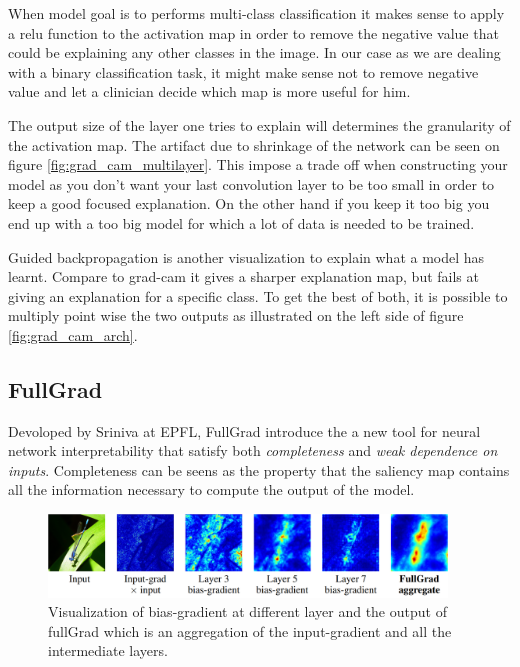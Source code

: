 When model goal is to performs multi-class classification it makes sense to apply a relu function to the activation map in order to remove the negative value that could be explaining any other classes in the image. In our case as we are dealing with a binary classification task, it might make sense not to remove negative value and let a clinician decide which map is more useful for him.

The output size of the layer one tries to explain will determines the granularity of the activation map. The artifact due to shrinkage of the network can be seen on figure \ref{fig:grad_cam_multilayer}. This impose a trade off when constructing your model as you don’t want your last convolution layer to be too small in order to keep a good focused explanation. On the other hand if you keep it too big you end up with a too big model for which a lot of data is needed to be trained.

Guided backpropagation\cite{guided_backprop_springenberg2014striving} is another visualization to explain what a model has learnt. Compare to grad-cam it gives a sharper explanation map, but fails at giving an explanation for a specific class. To get the best of both, it is possible to multiply point wise the two outputs as illustrated on the left side of figure \ref{fig:grad_cam_arch}.


\subsection{FullGrad}

Devoloped by Sriniva at EPFL, FullGrad\cite{fullgradient} introduce the a new tool for neural network interpretability that satisfy both \textit{completeness} and \textit{weak dependence on inputs}. Completeness can be seens as the property that the saliency map contains all the information necessary to compute the output of the model.

\begin{figure}
    \centering
    \includegraphics[width=400]{figures/fullgrad_layer_agregation.png}
    \caption[FullGradExample]{Visualization\cite{fullgradient} of bias-gradient at different layer and the output of fullGrad which is an aggregation of the input-gradient and all the intermediate layers.}
    \label{fig:full_grad_layer_aggreagtion}
\end{figure}

